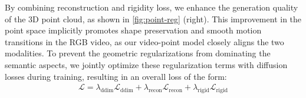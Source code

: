 By combining reconstruction and rigidity loss, we enhance the generation quality of the 3D point cloud, as shown in \autoref{fig:point-reg} (right). This improvement in the point space implicitly promotes shape preservation and smooth motion transitions in the RGB video, as our video-point model closely aligns the two modalities. To prevent the geometric regularizations from dominating the semantic aspects, we jointly optimize these regularization terms with diffusion losses during training, resulting in an overall loss of the form:
\begin{align}
    \mathcal{L} = \lambda_{\text{ddim}}\mathcal{L}_{\text{ddim}}  + \lambda_{\text{recon}} \mathcal{L}_{\text{recon}} + \lambda_{\text{rigid}} \mathcal{L}_{\text{rigid}}
\end{align}




